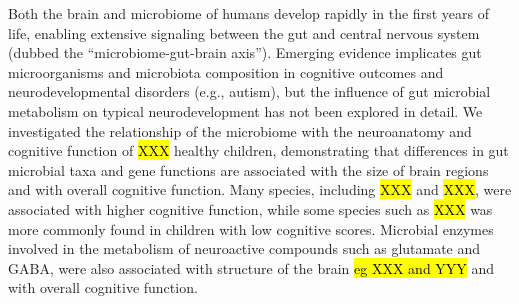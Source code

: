 Both the brain and microbiome of humans develop rapidly in the first years of life,
enabling extensive signaling between the gut and central nervous system (dubbed the “microbiome-gut-brain axis”).
Emerging evidence implicates gut microorganisms and microbiota composition in cognitive outcomes
and neurodevelopmental disorders (e.g., autism),
but the influence of gut microbial metabolism on typical neurodevelopment has not been explored in detail.
We investigated the relationship of the microbiome with the neuroanatomy and cognitive function
of \hl{XXX} healthy children,
demonstrating that differences in gut microbial taxa and gene functions
are associated with the size of brain regions and with overall cognitive function.
Many species, including \hl{XXX} and \hl{XXX}, were associated with higher cognitive function, 
while some species such as \hl{XXX} was more commonly found in children with low cognitive scores.
Microbial enzymes involved in the metabolism of neuroactive compounds such as glutamate and GABA,
were also associated with structure of the brain \hl{eg XXX and YYY} and with overall cognitive function.